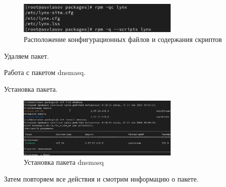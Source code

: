 \documentclass[
  12pt,
  a4paper,
  DIV=11,
  numbers=noendperiod]{scrreprt}
\begin{document}
\begin{figure}

{\centering \includegraphics[width=0.7\textwidth,height=\textheight]{image/18.png}

}

\caption{Расположение конфигурационных файлов и содержания скриптов}

\end{figure}%

Удаляем пакет.

Работа с пакетом dnsmasq.

Установка пакета.

\begin{figure}

{\centering \includegraphics[width=0.7\textwidth,height=\textheight]{image/19.png}

}

\caption{Установка пакета dnsmasq}

\end{figure}%

Затем повторяем все действия и смотрим информацию о пакете.
\end{document}

